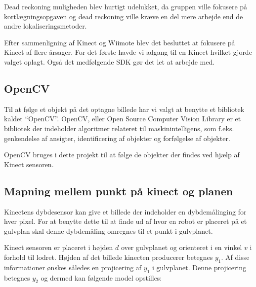 Dead reckoning muligheden blev hurtigt udelukket, da gruppen ville fokusere på kortlægningsopgaven og dead reckoning ville kræve en del mere arbejde end de andre lokaliseringsmetoder.

Efter sammenligning af Kinect og Wiimote blev det besluttet at fokusere på Kinect af flere årsager.
For det første havde vi adgang til en Kinect hvilket gjorde valget oplagt. 
Også det medfølgende SDK gør det let at arbejde med.

\subsection{OpenCV}
Til at følge et objekt på det optagne billede har vi valgt at benytte et bibliotek kaldet ``OpenCV''.
OpenCV, eller Open Source Computer Vision Library er et bibliotek der indeholder algoritmer relateret til maskinintelligens, som f.eks. genkendelse af ansigter, identificering af objekter og forfølgelse af objekter.\cite{opencv}

OpenCV bruges i dette projekt til at følge de objekter der findes ved hjælp af Kinect sensoren.

\clearpage
\subsection{Mapning mellem punkt på kinect og planen}

Kinectens dybdesensor kan give et billede der indeholder en dybdemålinging for hver pixel. 
For at benytte dette til at finde ud af hvor en robot er placeret på et gulvplan skal denne dybdemåling omregnes til et punkt i gulvplanet.

Kinect sensoren er placeret i højden $ d $ over gulvplanet og orienteret i en vinkel $v$ i forhold til lodret.
Højden af det billede kinecten producerer betegnes $y_1$.
Af disse informationer ønskes således en projicering af $y_1$ i gulvplanet.
Denne projicering betegnes $y_2$ og dermed kan følgende model opstilles:

\begin{center}
\end{center}


